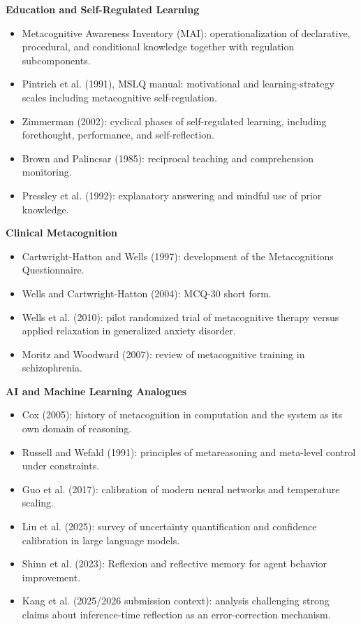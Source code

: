 \documentclass{book}
\providecommand{\ProjectDeepHeading}[2]{%
    \par\medskip\noindent\textbf{#2}\par\smallskip
}
\begin{document}
   \ProjectDeepHeading{6}{Education and Self-Regulated Learning}

   \begin{itemize}
      \item Metacognitive Awareness Inventory (MAI): operationalization of declarative, procedural, and conditional knowledge together with regulation subcomponents.
      \item Pintrich et al. (1991), MSLQ manual: motivational and learning-strategy scales including metacognitive self-regulation.
      \item Zimmerman (2002): cyclical phases of self-regulated learning, including forethought, performance, and self-reflection.
      \item Brown and Palincsar (1985): reciprocal teaching and comprehension monitoring.
      \item Pressley et al. (1992): explanatory answering and mindful use of prior knowledge.
   \end{itemize}

   \ProjectDeepHeading{6}{Clinical Metacognition}

   \begin{itemize}
      \item Cartwright-Hatton and Wells (1997): development of the Metacognitions Questionnaire.
      \item Wells and Cartwright-Hatton (2004): MCQ-30 short form.
      \item Wells et al. (2010): pilot randomized trial of metacognitive therapy versus applied relaxation in generalized anxiety disorder.
      \item Moritz and Woodward (2007): review of metacognitive training in schizophrenia.
   \end{itemize}

   \ProjectDeepHeading{6}{AI and Machine Learning Analogues}

   \begin{itemize}
      \item Cox (2005): history of metacognition in computation and the system as its own domain of reasoning.
      \item Russell and Wefald (1991): principles of metareasoning and meta-level control under constraints.
      \item Guo et al. (2017): calibration of modern neural networks and temperature scaling.
      \item Liu et al. (2025): survey of uncertainty quantification and confidence calibration in large language models.
      \item Shinn et al. (2023): Reflexion and reflective memory for agent behavior improvement.
      \item Kang et al. (2025/2026 submission context): analysis challenging strong claims about inference-time reflection as an error-correction mechanism.
   \end{itemize}
\end{document}
